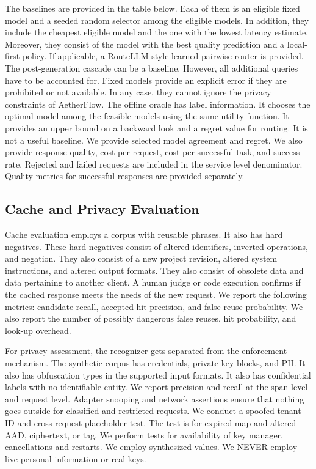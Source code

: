 \documentclass{FastFyp}
\begin{document}
The baselines are provided in the table below.
Each of them is an eligible fixed model and a seeded random selector among the eligible models.
In addition, they include the cheapest eligible model and the one with the lowest latency estimate.
Moreover, they consist of the model with the best quality prediction and a local-first policy.
If applicable, a RouteLLM-style learned pairwise router is provided.
The post-generation cascade can be a baseline.
However, all additional queries have to be accounted for.
Fixed models provide an explicit error if they are prohibited or not available.
In any case, they cannot ignore the privacy constraints of AetherFlow.
The offline oracle has label information.
It chooses the optimal model among the feasible models using the same utility function.
It provides an upper bound on a backward look and a regret value for routing.
It is not a useful baseline.
We provide selected model agreement and regret.
We also provide response quality, cost per request, cost per successful task, and success rate.
Rejected and failed requests are included in the service level denominator.
Quality metrics for successful responses are provided separately.

\subsection{Cache and Privacy Evaluation}
Cache evaluation employs a corpus with reusable phrases.
It also has hard negatives.
These hard negatives consist of altered identifiers, inverted operations, and negation.
They also consist of a new project revision, altered system instructions, and altered output formats.
They also consist of obsolete data and data pertaining to another client.
A human judge or code execution confirms if the cached response meets the needs of the new request.
We report the following metrics:
candidate recall, accepted hit precision, and false-reuse probability.
We also report the number of possibly dangerous false reuses, hit probability, and look-up overhead.

For privacy assessment, the recognizer gets separated from the enforcement mechanism.
The synthetic corpus has credentials, private key blocks, and PII.
It also has obfuscation types in the supported input formats.
It also has confidential labels with no identifiable entity.
We report precision and recall at the span level and request level.
Adapter snooping and network assertions ensure that nothing goes outside for classified and restricted requests.
We conduct a spoofed tenant ID and cross-request placeholder test.
The test is for expired map and altered AAD, ciphertext, or tag.
We perform tests for availability of key manager, cancellations and restarts.
We employ synthesized values.
We NEVER employ live personal information or real keys.
\end{document}
